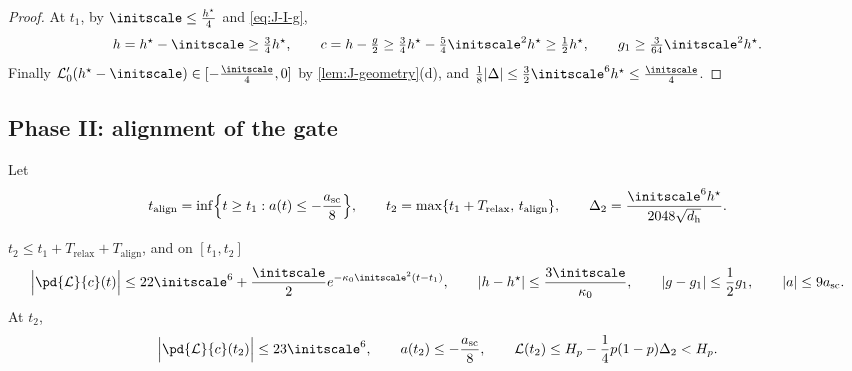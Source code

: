 \begin{proof}
At $t_1$, by $\initscale\le\frac{h^\star}{4}$ and \cref{eq:J-I-g},
\[
  h= h^\star-\initscale\ge\tfrac{3}{4} h^\star,\qquad c= h-\tfrac{g}{2}\ge\tfrac{3}{4} h^\star-\tfrac{5}{4}\initscale^2 h^\star\ge\tfrac{1}{2} h^\star,\qquad  g_1\ge\tfrac{3}{64}\initscale^2 h^\star .
\]
Finally $ \mathcal L_0'( h^\star-\initscale)\in[-\frac{\initscale}{4},0]$ by \cref{lem:J-geometry}(d), and $\frac{1}{8}|\Delta|\le\frac{3}{2}\initscale^6 h^\star\le\frac{\initscale}{4}$.
\end{proof}

\subsection{Phase II: alignment of the gate}

Let
\begin{gather*}
 t_{\mathrm{align}}=\inf\Bigl\{t\ge t_1:a(t)\le-\frac{a_{\mathrm{sc}}}{8}\Bigr\},\qquad t_2=\max\{t_1+T_{\mathrm{relax}},\,t_{\mathrm{align}}\},\qquad
 \Delta_2=\frac{\initscale^6h^\star}{2048\sqrt{d_{\mathrm h}}}.
\end{gather*}

\begin{lemma}
\label{lem:J-phase2}
$t_2\le t_1+T_{\mathrm{relax}}+T_{\mathrm{align}}$, and on $[t_1,t_2]$
\[
 \Bigl|\pd{\mathcal L}{c}(t)\Bigr|\le22\initscale^6+\frac{\initscale}{2}e^{-\kappa_0\initscale^2(t-t_1)},\qquad |h-h^\star|\le\frac{3\initscale}{\kappa_0},\qquad
 |g-g_1|\le\frac{1}{2}g_1,\qquad |a|\le9a_{\mathrm{sc}} .
\]
At $t_2$,
\[
 \Bigl|\pd{\mathcal L}{c}(t_2)\Bigr|\le23\initscale^6,\qquad a(t_2)\le-\frac{a_{\mathrm{sc}}}{8},\qquad \mathcal L(t_2)\le H_p-\frac{1}{4}p(1-p)\Delta_2<H_p .
\]
\end{lemma}

